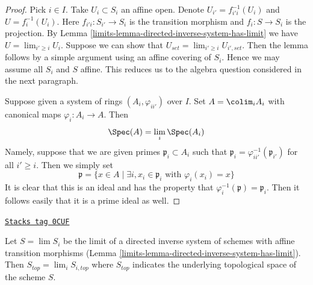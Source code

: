 \begin{proof}

Pick $i \in I$. Take $U_i \subset S_i$ an affine open.
Denote $U_{i'} = f_{i'i}^{-1}(U_i)$ and $U = f_i^{-1}(U_i)$.
Here $f_{i'i} : S_{i'} \to S_i$ is the transition morphism
and $f_i : S \to S_i$ is the projection.
By Lemma \ref{limits-lemma-directed-inverse-system-has-limit}
we have $U = \lim_{i' \geq i} U_i$.
Suppose we can show that $U_{set} = \lim_{i' \geq i} U_{i', set}$. Then
the lemma follows by a simple argument using an affine covering of $S_i$.
Hence we may assume all $S_i$ and $S$ affine. This reduces us to the
algebra question considered in the next paragraph.

\medskip\noindent
Suppose given a system of rings $(A_i, \varphi_{ii'})$
over $I$. Set $A = \colim_i A_i$ with canonical maps $\varphi_i : A_i \to A$.
Then
$$
\Spec(A) = \lim_i \Spec(A_i)
$$
Namely, suppose that we are given primes $\mathfrak p_i \subset A_i$
such that $\mathfrak p_i = \varphi_{ii'}^{-1}(\mathfrak p_{i'})$
for all $i' \geq i$. Then we simply set
$$
\mathfrak p =
\{x \in A
\mid
\exists i, x_i \in \mathfrak p_i \text{ with }\varphi_i(x_i) = x\}
$$
It is clear that this is an ideal and has the property that
$\varphi_i^{-1}(\mathfrak p) = \mathfrak p_i$. Then it follows
easily that it is a prime ideal as well.
\end{proof}

\begin{lemma}
\label{limits-lemma-inverse-limit-top}
\href{https://stacks.math.columbia.edu/tag/0CUF}{\texttt{Stacks tag 0CUF}}

\begin{reference}
\cite[IV, Proposition 8.2.9]{EGA}
\end{reference}
Let $S = \lim S_i$ be the limit of a directed inverse system
of schemes with affine transition morphisms
(Lemma \ref{limits-lemma-directed-inverse-system-has-limit}). Then
$S_{top} = \lim_i S_{i, top}$ where $S_{top}$
indicates the underlying topological space of the scheme $S$.
\end{lemma}

